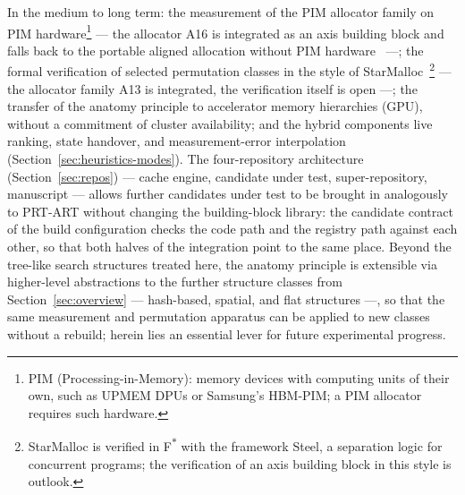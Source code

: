 \begin{nurlang}
\medskip
In the medium to long term: the measurement of the PIM allocator family on PIM
hardware\footnote{PIM (Processing-in-Memory): memory devices with computing units of their own,
such as UPMEM DPUs or Samsung's HBM-PIM\@; a PIM allocator requires such hardware.} --- the
allocator A16 is integrated as an axis building block and falls back to the portable aligned
allocation without PIM hardware~\cite{pimmalloc2026} ---; the formal verification of selected
permutation classes in the style of StarMalloc~\cite{reitz2024starmalloc}\footnote{StarMalloc is
verified in F\textsuperscript{$\ast$} with the framework Steel, a separation logic for concurrent
programs; the verification of an axis building block in this style is outlook.} --- the allocator
family A13 is integrated, the verification itself is open ---; the transfer of the anatomy
principle to accelerator memory hierarchies (GPU), without a commitment of cluster availability;
and the hybrid components live ranking, state handover, and measurement-error interpolation
(Section~\ref{sec:heuristics-modes}). The four-repository architecture (Section~\ref{sec:repos})
--- cache engine, candidate under test, super-repository, manuscript --- allows further candidates under test to be brought in
analogously to PRT-ART without changing the building-block library: the candidate contract of the
build configuration checks the code path and the registry path against each other, so that both
halves of the integration point to the same place. Beyond the tree-like search structures treated
here, the anatomy principle is extensible via higher-level abstractions to the further structure
classes from Section~\ref{sec:overview} --- hash-based, spatial, and flat structures ---, so that
the same measurement and permutation apparatus can be applied to new classes without a rebuild;
herein lies an essential lever for future experimental progress.
\end{nurlang}

